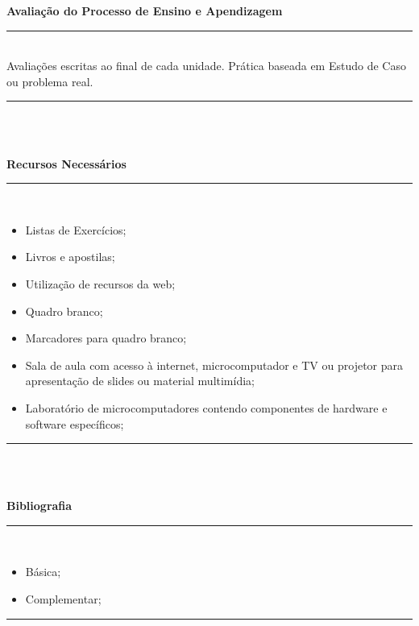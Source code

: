 \begin{center}\textbf{Avaliação do Processo de Ensino e Apendizagem}\end{center}
\noindent\rule{16cm}{0.4pt}
\\
   Avaliações escritas ao final de cada unidade. Prática baseada em Estudo de Caso ou problema real.\\
\noindent\rule{16cm}{0.4pt}\\
\\
\begin{center}\textbf{Recursos Necessários}\end{center}
\noindent\rule{16cm}{0.4pt}
\\
\begin{itemize} 
  \item Listas de Exercícios;
  \item Livros e apostilas;
  \item Utilização de recursos da web;
  \item Quadro branco;
  \item Marcadores para quadro branco;
  \item Sala de aula com acesso à internet, microcomputador e TV ou projetor para apresentação de slides ou material multimídia;
  \item Laboratório de microcomputadores contendo componentes de hardware e software específicos;
\end{itemize}
\noindent\rule{16cm}{0.4pt}\\
\\
\begin{center}\textbf{Bibliografia}\end{center}
\noindent\rule{16cm}{0.4pt}
\\
\begin{itemize} 
  \item Básica;
  \item Complementar;
\end{itemize}
\noindent\rule{16cm}{0.4pt}\\
\\
